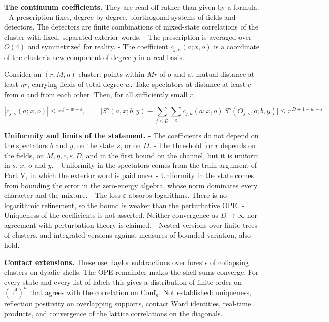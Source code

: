 \documentclass[
  letterpaper,
  11pt]{article}
\begin{document}
\textbf{The continuum coefficients.} They are read off rather than given
by a formula. - A prescription fixes, degree by degree, biorthogonal
systems of fields and detectors. The detectors are finite combinations
of mixed-state correlations of the cluster with fixed, separated
exterior words. - The prescription is averaged over \(O(4)\) and
symmetrized for reality. - The coefficient \(c_{j,\kappa}(a;x,o)\) is a
coordinate of the cluster's new component of degree \(j\) in a real
basis.

Consider an \((r,M,\eta)\)-cluster: points within \(Mr\) of \(o\) and at
mutual distance at least \(\eta r\), carrying fields of total degree
\(w\). Take spectators at distance at least \(c\) from \(o\) and from
each other. Then, for all sufficiently small \(r\),

\[|c_{j,\kappa}(a;x,o)|\le r^{\,j-w-\varepsilon},\qquad
\Big|S^s(a,x;b,y)-\sum_{j\le D}\sum_\kappa c_{j,\kappa}(a;x,o)\,S^s(O_{j,\kappa},o;b,y)\Big|\le r^{\,D+1-w-\varepsilon}.\]

\textbf{Uniformity and limits of the statement.} - The coefficients do
not depend on the spectators \(b\) and \(y\), on the state \(s\), or on
\(D\). - The threshold for \(r\) depends on the fields, on
\(M,\eta,c,\varepsilon,D\), and in the first bound on the channel, but
it is uniform in \(s\), \(x\), \(o\) and \(y\). - Uniformity in the
spectators comes from the train argument of Part V, in which the
exterior word is paid once. - Uniformity in the state comes from
bounding the error in the zero-energy algebra, whose norm dominates
every character and the mixture. - The loss \(\varepsilon\) absorbs
logarithms. There is no logarithmic refinement, so the bound is weaker
than the perturbative OPE. - Uniqueness of the coefficients is not
asserted. Neither convergence as \(D\to\infty\) nor agreement with
perturbation theory is claimed. - Nested versions over finite trees of
clusters, and integrated versions against measures of bounded variation,
also hold.

\textbf{Contact extensions.} These use Taylor subtractions over forests
of collapsing clusters on dyadic shells. The OPE remainder makes the
shell sums converge. For every state and every list of labels this gives
a distribution of finite order on \((\mathbb R^4)^n\) that agrees with
the correlation on \(\mathrm{Conf}_n\). Not established: uniqueness,
reflection positivity on overlapping supports, contact Ward identities,
real-time products, and convergence of the lattice correlations on the
diagonals.
\end{document}
